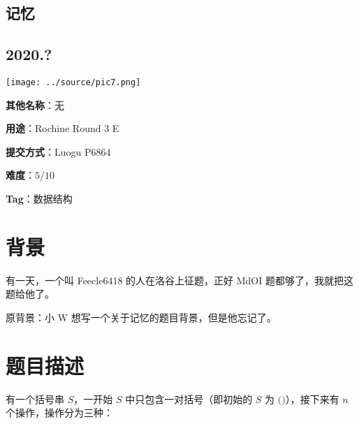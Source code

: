 \documentclass[a4paper,10pt]{article}
\begin{document}
\vspace*{\fill}
\begin{center}

\section{记忆}

\subsection*{2020.?}

\vspace{10pt}

\texttt{[image: ../source/pic7.png]}

\vspace{10pt}

\textbf{其他名称}：无

\vspace{10pt}

\textbf{用途}：Rochine Round 3 E

\vspace{10pt}

\textbf{提交方式}：Luogu P6864

\vspace{10pt}

\textbf{难度}：$5/10$

\vspace{10pt}

\textbf{Tag}：数据结构

\end{center}
\vspace*{\fill}

\newpage

\section*{背景}

有一天，一个叫 Feecle6418 的人在洛谷上征题，正好 MdOI 题都够了，我就把这题给他了。

原背景：小 W 想写一个关于记忆的题目背景，但是他忘记了。

\section*{题目描述}

有一个括号串 $S$，一开始 $S$ 中只包含一对括号（即初始的 $S$ 为 $\texttt{()}$），接下来有 $n$ 个操作，操作分为三种：
\end{document}
